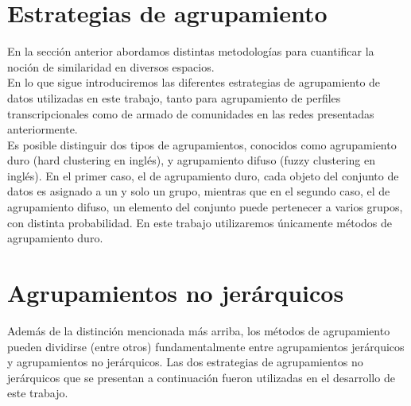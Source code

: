 \section{Estrategias de agrupamiento}
En la sección anterior abordamos distintas metodologías para cuantificar la noción de similaridad en diversos espacios.\\
En lo que sigue introduciremos las diferentes estrategias de agrupamiento de datos utilizadas en este trabajo, tanto para agrupamiento de perfiles transcripcionales como de armado de comunidades en las redes presentadas anteriormente.\\
Es posible distinguir dos tipos de agrupamientos, conocidos como agrupamiento duro (hard clustering en inglés), y agrupamiento difuso (fuzzy clustering en inglés). En el primer caso, el de agrupamiento duro, cada objeto del conjunto de datos es asignado a un y solo un grupo, mientras que en el segundo caso, el de agrupamiento difuso, un elemento del conjunto puede pertenecer a varios grupos, con distinta probabilidad. En este trabajo utilizaremos únicamente métodos de agrupamiento duro.\\
\section{Agrupamientos no jerárquicos}
Además de la distinción mencionada más arriba, los métodos de agrupamiento pueden dividirse (entre otros) fundamentalmente entre agrupamientos jerárquicos y agrupamientos no jerárquicos.
Las dos estrategias de agrupamientos no jerárquicos que se presentan a continuación fueron utilizadas en el desarrollo de este trabajo.

